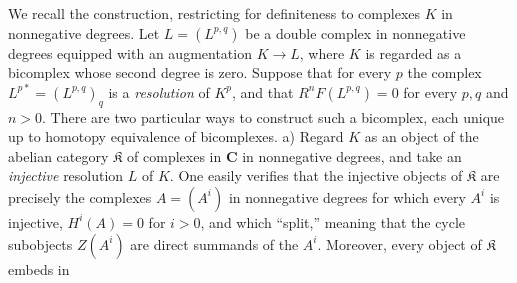 We recall the construction, restricting for definiteness to complexes $K$ in
nonnegative degrees. Let $L=(L^{p,q})$ be a double complex in nonnegative
degrees equipped with an augmentation $K\to L$, where $K$ is
regarded as a bicomplex whose second degree is zero. Suppose that for every
$p$ the complex $L^{p*}=(L^{p,q})_q$ is a \textit{resolution} of $K^p$, and that
$R^nF(L^{p,q})=0$ for every $p,q$ and $n>0$. There are two particular ways to
construct such a bicomplex, each unique up to homotopy equivalence of
bicomplexes. a) Regard $K$ as an object of the abelian category $\mathfrak K$
of complexes in $\mathbf{C}$ in nonnegative degrees, and take an \textit{injective} resolution
$L$ of $K$. One easily verifies that the injective objects of $\mathfrak K$ are precisely the complexes
$A=(A^i)$ in nonnegative degrees for which every $A^i$ is injective,
$H^i(A)=0$ for $i>0$, and which ``split,'' meaning that the cycle subobjects
$Z(A^i)$ are direct summands of the $A^i$. Moreover, every object of
$\mathfrak K$ embeds in

